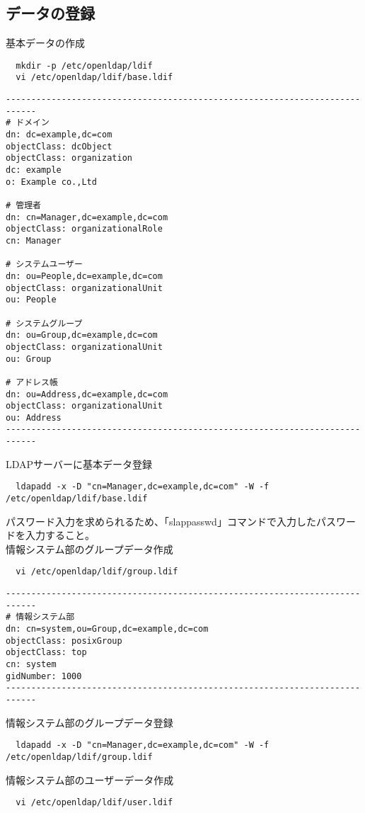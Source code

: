 \subsection{データの登録}
基本データの作成
\begin{verbatim}
  mkdir -p /etc/openldap/ldif
  vi /etc/openldap/ldif/base.ldif
\end{verbatim}
\begin{verbatim}
----------------------------------------------------------------------------
# ドメイン
dn: dc=example,dc=com
objectClass: dcObject
objectClass: organization
dc: example
o: Example co.,Ltd

# 管理者
dn: cn=Manager,dc=example,dc=com
objectClass: organizationalRole
cn: Manager

# システムユーザー
dn: ou=People,dc=example,dc=com
objectClass: organizationalUnit
ou: People

# システムグループ
dn: ou=Group,dc=example,dc=com
objectClass: organizationalUnit
ou: Group

# アドレス帳
dn: ou=Address,dc=example,dc=com
objectClass: organizationalUnit
ou: Address
----------------------------------------------------------------------------
\end{verbatim}
LDAPサーバーに基本データ登録
\begin{verbatim}
  ldapadd -x -D "cn=Manager,dc=example,dc=com" -W -f /etc/openldap/ldif/base.ldif
\end{verbatim}
パスワード入力を求められるため、「slappasswd」コマンドで入力したパスワードを入力すること。\\
情報システム部のグループデータ作成
\begin{verbatim}
  vi /etc/openldap/ldif/group.ldif
\end{verbatim}
\begin{verbatim}
----------------------------------------------------------------------------
# 情報システム部
dn: cn=system,ou=Group,dc=example,dc=com
objectClass: posixGroup
objectClass: top
cn: system
gidNumber: 1000
----------------------------------------------------------------------------
\end{verbatim}
情報システム部のグループデータ登録
\begin{verbatim}
  ldapadd -x -D "cn=Manager,dc=example,dc=com" -W -f /etc/openldap/ldif/group.ldif
\end{verbatim}
情報システム部のユーザーデータ作成
\begin{verbatim}
  vi /etc/openldap/ldif/user.ldif
\end{verbatim}
